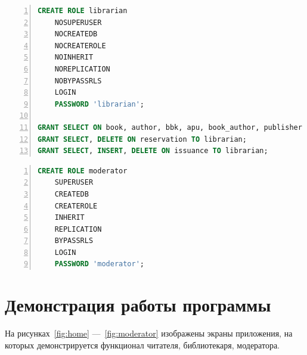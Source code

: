 \begin{center}
	\captionsetup{justification=raggedright,singlelinecheck=off}
	\begin{lstlisting}[language=sql, frame=single, numbers=left, caption=Создание роли библиотекаря]
CREATE ROLE librarian
	NOSUPERUSER
	NOCREATEDB
	NOCREATEROLE
	NOINHERIT
	NOREPLICATION
	NOBYPASSRLS
	LOGIN
	PASSWORD 'librarian';

GRANT SELECT ON book, author, bbk, apu, book_author, publisher TO librarian;
GRANT SELECT, DELETE ON reservation TO librarian;
GRANT SELECT, INSERT, DELETE ON issuance TO librarian;
	\end{lstlisting}
\end{center}

\begin{center}
	\captionsetup{justification=raggedright,singlelinecheck=off}
	\begin{lstlisting}[language=sql, frame=single, numbers=left, label=lst:moderator, caption=Создание роли модератора]
CREATE ROLE moderator
	SUPERUSER
	CREATEDB
	CREATEROLE
	INHERIT
	REPLICATION
	BYPASSRLS
	LOGIN
	PASSWORD 'moderator';
	\end{lstlisting}
\end{center}

\section{Демонстрация работы программы}

На рисунках~\ref{fig:home} ---~\ref{fig:moderator} изображены экраны приложения, на которых демонстрируется функционал читателя, библиотекаря, модератора.

